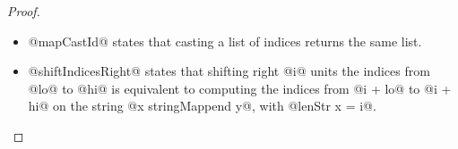 \begin{proof}
\begin{itemize}
%
\item @mapCastId@ states that casting a list of indices returns the same list.
\item @shiftIndicesRight@ states that shifting right @i@ units the indices from @lo@ to @hi@
is equivalent to computing the indices from @i + lo@
to @i + hi@ on the string @x stringMappend y@, with @lenStr x = i@.
\end{itemize}
\cqed\end{proof}
